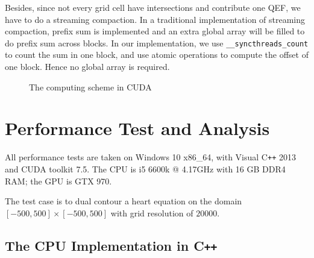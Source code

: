 \documentclass[a4paper,12pt]{article}
\begin{document}
Besides, since not every grid cell have intersections and contribute
one QEF, we have to do a streaming compaction.
In a traditional implementation of streaming compaction,
prefix sum is implemented and an extra global array will be filled to
do prefix sum across blocks.
In our implementation, we use \texttt{\_\_syncthreads\_count}
to count the sum in one block,
and use atomic operations to compute the offset of one block.
Hence no global array is required.

\begin{figure}[h]
\centering
{}
\caption{The computing scheme in CUDA}
\label{fig:computing-scheme-cuda}
\end{figure}

\section{Performance Test and Analysis}

All performance tests are taken on Windows 10 x86\_64,
with Visual C\texttt{++} 2013 and CUDA toolkit 7.5.
The CPU is i5 6600k @ 4.17GHz with 16 GB DDR4 RAM; the GPU is GTX 970.

The test case is to dual contour a heart equation
on the domain $[-500, 500]\times[-500, 500]$
with grid resolution of $20000$.

\subsection{The CPU Implementation in C\texttt{++}}
\end{document}
